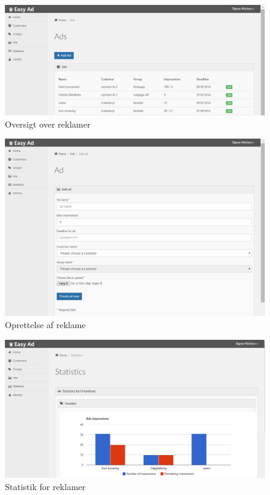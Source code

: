 \documentclass[a4paper,12pt]{article}
\begin{document}
\begin{figure}[p]
  \centering
    \includegraphics[width=\textwidth]{ads.png}
  \caption{Oversigt over reklamer}
\end{figure}

\begin{figure}[p]
  \centering
    \includegraphics[width=\textwidth]{ad_add.png}
  \caption{Oprettelse af reklame}
\end{figure}

\begin{figure}[p]
  \centering
    \includegraphics[width=\textwidth]{statistics.png}
  \caption{Statistik for reklamer}
\end{figure}
\end{document}
